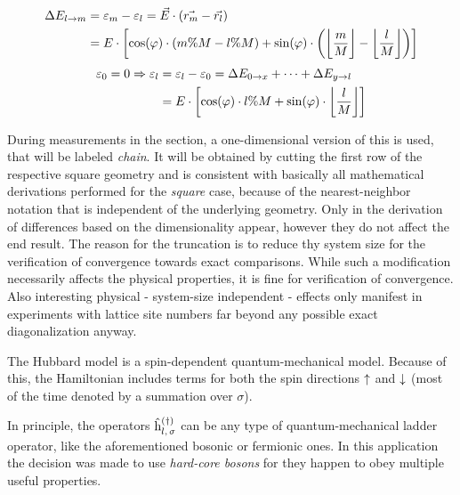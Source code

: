 \begin{equation}
    \label{eq:energy-difference-hopping}
    \begin{split}
        \Delta E_{l \rightarrow m} &=  \epsl[m] - \epsl[l] = \vec{E} \cdot \left(\vec{r_m}-\vec{r_l}\right)\\
        &= E \cdot \left[\cos(\varphi)\cdot \left(m \% M-l \% M\right) + \sin(\varphi)\cdot \left(\floor[\bigg]{\frac{m}{M}}-\floor[\bigg]{\frac{l}{M}}\right)\right]
    \end{split}
\end{equation}
\vspace{0.5cm} %
\begin{equation}
    \label{eq:epsl}
    \begin{split}
        \epsl[0] = 0 \Rightarrow
        \epsl[l] &= \epsl[l] - \epsl[0] = \Delta E_{0 \rightarrow x} + \dots + \Delta E_{y \rightarrow l}\\
        &= E \cdot \left[\cos(\varphi)\cdot l \% M + \sin(\varphi)\cdot \floor[\bigg]{\frac{l}{M}}\right]
    \end{split}
\end{equation}

During measurements in the  section, a one-dimensional version of this is used, that will be labeled \emph{chain}. 
It will be obtained by cutting the first row of the respective square geometry and is consistent with basically all mathematical derivations performed for the \emph{square} case, because of the nearest-neighbor notation that is independent of the underlying geometry. Only in the derivation of  differences based on the dimensionality appear, however they do not affect the end result.
The reason for the truncation is to reduce thy system size for the verification of convergence towards exact comparisons.
While such a modification necessarily affects the physical properties, it is fine for verification of convergence.
Also interesting physical - system-size independent - effects only manifest in experiments with lattice site numbers far beyond any possible exact diagonalization anyway.

The Hubbard model \cite{hubbardModelOriginalDerivation} is a spin-dependent quantum-mechanical model. 
Because of this, the Hamiltonian includes terms for both the spin directions $\up$ and $\down$ (most of the time denoted by a summation over $\sigma$).

In principle, the operators $\withspinhcop[]{l}{\sigma}{(\dagger)}$ can be any type of quantum-mechanical ladder operator, like the aforementioned bosonic or fermionic ones.
In this application the decision was made to use \emph{hard-core bosons} \cite[]{hardCoreBosonsBasics} for they happen to obey multiple useful properties.

